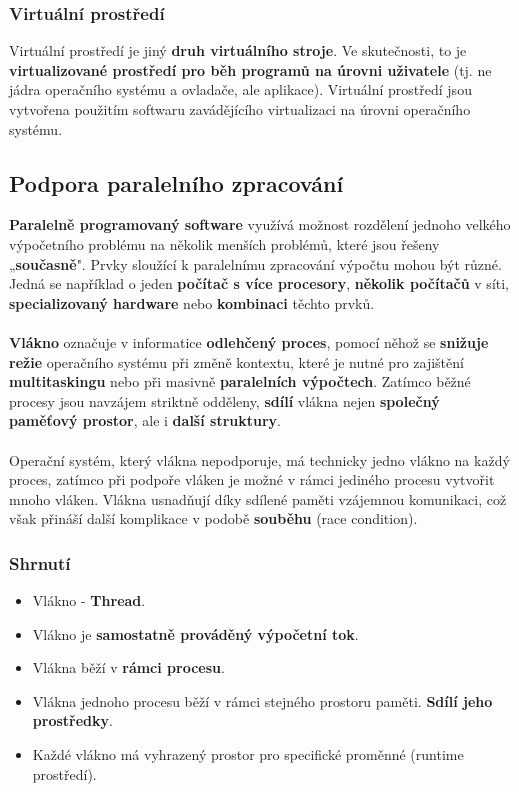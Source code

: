 \subsubsection{Virtuální prostředí}
Virtuální prostředí je jiný \textbf{druh virtuálního stroje}. Ve skutečnosti, to je \textbf{virtualizované prostředí pro běh programů na úrovni uživatele} (tj. ne jádra operačního systému a ovladače, ale aplikace). Virtuální prostředí jsou vytvořena použitím softwaru zavádějícího virtualizaci na úrovni operačního systému.

\subsection{Podpora paralelního zpracování}
\textbf{Paralelně programovaný software} využívá možnost rozdělení jednoho velkého výpočetního problému na několik menších problémů, které jsou řešeny „\textbf{současně}". Prvky sloužící k paralelnímu zpracování výpočtu mohou být různé. Jedná se například o jeden \textbf{počítač s více procesory}, \textbf{několik počítačů }v síti, \textbf{specializovaný hardware} nebo \textbf{kombinaci} těchto prvků.
\\\\
\textbf{Vlákno} označuje v informatice \textbf{odlehčený proces}, pomocí něhož se \textbf{snižuje režie} operačního systému při změně kontextu, které je nutné pro zajištění \textbf{multitaskingu} nebo při masivně \textbf{paralelních výpočtech}. Zatímco běžné procesy jsou navzájem striktně odděleny, \textbf{sdílí} vlákna nejen \textbf{společný paměťový prostor}, ale i \textbf{další struktury}.
\\\\
Operační systém, který vlákna nepodporuje, má technicky jedno vlákno na každý proces, zatímco při podpoře vláken je možné v rámci jediného procesu vytvořit mnoho vláken. Vlákna usnadňují díky sdílené paměti vzájemnou komunikaci, což však přináší další komplikace v podobě \textbf{souběhu} (race condition).

\subsubsection{Shrnutí}
\begin{itemize}
	\item Vlákno - \textbf{Thread}.
	\item Vlákno je \textbf{samostatně prováděný výpočetní tok}.
	\item Vlákna běží v \textbf{rámci procesu}.
	\item Vlákna jednoho procesu běží v rámci stejného prostoru paměti. \textbf{Sdílí jeho prostředky}.
	\item Každé vlákno má vyhrazený prostor pro specifické proměnné (runtime prostředí).
\end{itemize}

